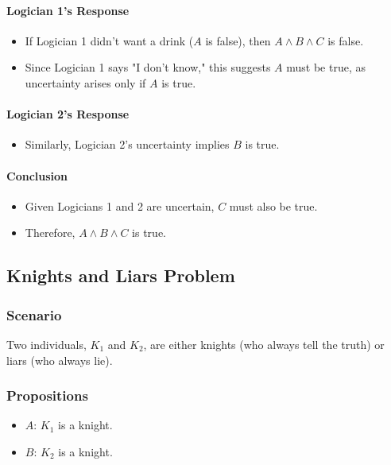 \documentclass{article}
\begin{document}
\paragraph{Logician 1's Response}
\begin{itemize}
    \item If Logician 1 didn’t want a drink ($A$ is false), then $A \land B \land C$ is false.
    \item Since Logician 1 says "I don't know," this suggests $A$ must be true, as uncertainty arises only if $A$ is true.
\end{itemize}

\paragraph{Logician 2's Response}
\begin{itemize}
    \item Similarly, Logician 2's uncertainty implies $B$ is true.
\end{itemize}

\paragraph{Conclusion}
\begin{itemize}
    \item Given Logicians 1 and 2 are uncertain, $C$ must also be true.
    \item Therefore, $A \land B \land C$ is true.
\end{itemize}

\subsection{Knights and Liars Problem}

\subsubsection{Scenario}
Two individuals, $K_1$ and $K_2$, are either knights (who always tell the truth) or liars (who always lie).

\subsubsection{Propositions}
\begin{itemize}
    \item $A$: $K_1$ is a knight.
    \item $B$: $K_2$ is a knight.
\end{itemize}
\end{document}

